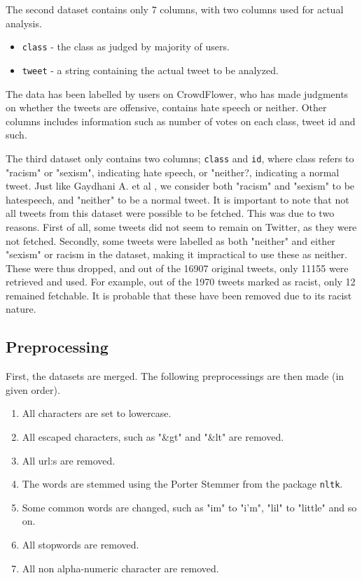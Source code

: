 \documentclass[twocolumn]{article}
\begin{document}
The second dataset contains only 7 columns, with two columns used for actual analysis. 

\begin{itemize}
\item \verb|class| - the class as judged by majority of users. 
\item \verb|tweet| - a string containing the actual tweet to be analyzed. 
\end{itemize}

The data has been labelled by users on CrowdFlower, who has made judgments on whether the tweets are offensive, contains hate speech or neither. Other columns includes information such as number of votes on each class, tweet id and such. 

The third dataset only contains two columns; \verb|class| and \verb|id|, where class refers to "racism" or "sexism", indicating hate speech, or "neither?, indicating a normal tweet. Just like Gaydhani A. et al \cite{gaydhani}, we consider both "racism" and "sexism" to be hatespeech, and "neither" to be a normal tweet. It is important to note that not all tweets from this dataset were possible to be fetched. This was due to two reasons. First of all, some tweets did not seem to remain on Twitter, as they were not fetched. Secondly, some tweets were labelled as both "neither" and either "sexism" or racism in the dataset, making it impractical to use these as neither. These were thus dropped, and out of the 16907 original tweets, only 11155 were retrieved and used. For example, out of the 1970 tweets marked as racist, only 12 remained fetchable. It is probable that these have been removed due to its racist nature. 

\subsection{Preprocessing}

First, the datasets are merged. The following preprocessings are then made (in given order). 

\begin{enumerate}
\item All characters are set to lowercase. 
\item All escaped characters, such as "\&gt" and "\&lt" are removed. 
\item All url:s are removed. 
\item The words are stemmed using the Porter Stemmer from the package \verb|nltk|.
\item Some common words are changed, such as "im" to "i'm", "lil" to "little" and so on. 
\item All stopwords are removed.
\item All non alpha-numeric character are removed. 
\end{enumerate}
\end{document}
